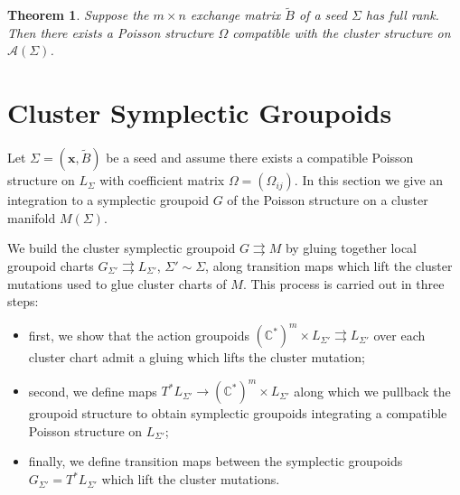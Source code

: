 \documentclass{amsart}
\newtheorem{theorem}{Theorem}[section]
\newcommand{\bfx}{\mathbf{x}}
\newcommand{\cA}{\mathcal{A}}
\newcommand{\CC}{\mathbb{C}}
\begin{document}
\begin{theorem}
  \cite{gekhtman-shapiro-vainshtein}
  Suppose the $m\times n$ exchange matrix $\tilde B$ of a seed $\Sigma$ has full rank.  Then there exists a Poisson structure $\Omega$ compatible with the cluster structure on $\cA(\Sigma)$.
\end{theorem}


\section{Cluster Symplectic Groupoids}
Let $\Sigma=(\bfx,\tilde B)$ be a seed and assume there exists a compatible Poisson structure on $L_\Sigma$ with coefficient matrix $\Omega=(\Omega_{ij})$.  
In this section we give an integration to a symplectic groupoid $G$ of the Poisson structure on a cluster manifold $M(\Sigma)$.  

We build the cluster symplectic groupoid $G\rightrightarrows M$ by gluing together local groupoid charts $G_{\Sigma'}\rightrightarrows L_{\Sigma'}$, $\Sigma'\sim\Sigma$, along transition maps which lift the cluster mutations used to glue cluster charts of $M$.
This process is carried out in three steps:
\begin{itemize}
  \item first, we show that the action groupoids $(\CC^*)^m\times L_{\Sigma'}\rightrightarrows L_{\Sigma'}$ over each cluster chart admit a gluing which lifts the cluster mutation;
  \item second, we define maps $T^*L_{\Sigma'}\to(\CC^*)^m\times L_{\Sigma'}$ along which we pullback the groupoid structure to obtain symplectic groupoids integrating a compatible Poisson structure on $L_{\Sigma'}$;
  \item finally, we define transition maps between the symplectic groupoids $G_{\Sigma'}=T^*L_{\Sigma'}$ which lift the cluster mutations.
\end{itemize}
\end{document}

